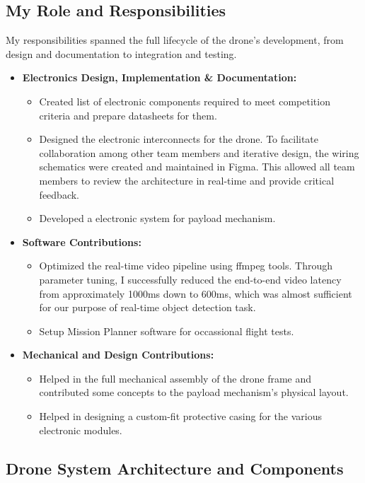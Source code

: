\subsection{My Role and Responsibilities}

My responsibilities spanned the full lifecycle of the drone's development, from design and documentation to integration and testing.

\noindent
\begin{itemize}
	\item \textbf{Electronics Design, Implementation \& Documentation:}
	      \begin{itemize}
					\item Created list of electronic components required to meet competition criteria and prepare datasheets for them.
		      \item Designed the electronic interconnects for the drone. To facilitate collaboration among other team members and iterative design, the wiring schematics were created and maintained in Figma. This allowed all team members to review the architecture in real-time and provide critical feedback.
		      \item Developed a electronic system for payload mechanism.
	      \end{itemize}
	\item  \textbf{Software Contributions:}
	      \begin{itemize}
		      \item Optimized the real-time video pipeline using ffmpeg tools. Through parameter tuning, I successfully reduced the end-to-end video latency from approximately 1000ms down to 600ms, which was almost sufficient for our purpose of real-time object detection task.
		      \item Setup Mission Planner software for occassional flight tests.
	      \end{itemize}
	\item \textbf{Mechanical and Design Contributions:}
	      \begin{itemize}
		      \item Helped in the full mechanical assembly of the drone frame and contributed some concepts to the payload mechanism's physical layout.
		      \item Helped in designing a custom-fit protective casing for the various electronic modules.
	      \end{itemize}
\end{itemize}


\subsection{Drone System Architecture and Components}

